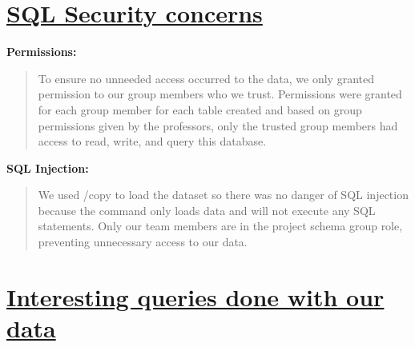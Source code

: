 \documentclass{article}
\begin{document}
\section*{\underline{SQL Security concerns}}
\textbf{Permissions:}
\begin{quote}  
To ensure no unneeded access occurred to the data, we only granted permission to our group members who we trust. Permissions were granted for each group member for each table created and based on group permissions given by the professors, only the trusted group members had access to read, write, and query this database.  
\end{quote}

\textbf{SQL Injection:}
\begin{quote}  
We used /copy to load the dataset so there was no danger of SQL injection because the command only loads data and will not execute any SQL statements. Only our team members are in the project schema group role, preventing unnecessary access to our data. 
\end{quote}


\section*{\underline{Interesting queries done with our data}}
\end{document}
